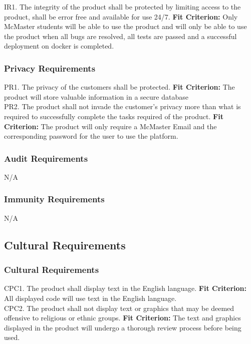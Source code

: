 \documentclass[12pt, titlepage]{article}
\begin{document}
IR1. The integrity of the product shall be protected by limiting access to the product, shall be error free and available for use 24/7.
	\textbf{Fit Criterion:} Only McMaster students will be able to use the product and will only be able to use the product when all bugs are resolved, all tests are passed and a successful deployment on docker is completed.

\subsubsection{Privacy Requirements}

PR1. The privacy of the customers shall be protected.
	\textbf{Fit Criterion:} The product will store valuable information in a secure database\\

\noindent PR2. The product shall not invade the customer’s privacy more than what is required to successfully complete the tasks required of the product. 
	\textbf{Fit Criterion:} The product will only require a McMaster Email and the corresponding password for the user to use the platform.

\subsubsection{Audit Requirements}

N/A

\subsubsection{Immunity Requirements}

N/A

\subsection{Cultural Requirements}

\subsubsection{Cultural Requirements}

CPC1. The product shall display text in the English language.
  \textbf{Fit Criterion:} All displayed code will use text in the English language. \\

\noindent CPC2. The product shall not display text or graphics that may be deemed offensive to religious or ethnic groups.
	\textbf{Fit Criterion:} The text and graphics displayed in the product will undergo a thorough review process before being used. 
\end{document}
